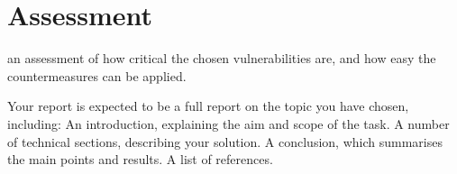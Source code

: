 \section{Assessment}
an assessment of how critical the chosen vulnerabilities are, and how easy the countermeasures
can be applied.


Your report is expected to be a full report on the topic you have chosen, including:
An introduction, explaining the aim and scope of the task.
A number of technical sections, describing your solution.
A conclusion, which summarises the main points and results.
A list of references.